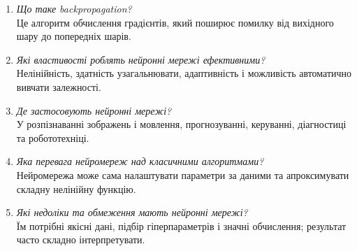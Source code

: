 \documentclass[12pt,a4paper]{article}
\begin{document}
\begin{enumerate}[leftmargin=*]
\item \textit{Що таке backpropagation?}\\
Це алгоритм обчислення градієнтів, який поширює помилку від вихідного шару до попередніх шарів.
\item \textit{Які властивості роблять нейронні мережі ефективними?}\\
Нелінійність, здатність узагальнювати, адаптивність і можливість автоматично вивчати залежності.
\item \textit{Де застосовують нейронні мережі?}\\
У розпізнаванні зображень і мовлення, прогнозуванні, керуванні, діагностиці та робототехніці.
\item \textit{Яка перевага нейромереж над класичними алгоритмами?}\\
Нейромережа може сама налаштувати параметри за даними та апроксимувати складну нелінійну функцію.
\item \textit{Які недоліки та обмеження мають нейронні мережі?}\\
Їм потрібні якісні дані, підбір гіперпараметрів і значні обчислення; результат часто складно інтерпретувати.
\end{enumerate}
\end{document}
